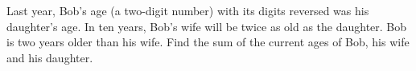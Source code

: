 Last year, Bob's age (a two-digit number) with its digits reversed was his daughter's age. In ten years, Bob's wife will be twice as old as the daughter. Bob is two years older than his wife. Find the sum of the current ages of Bob, his wife and his daughter.
